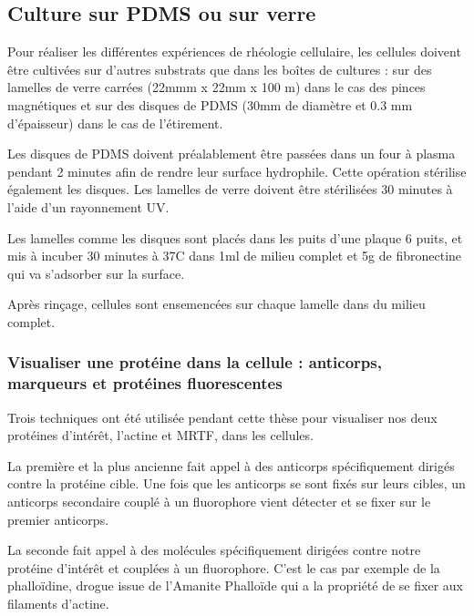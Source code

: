 	\subsection{Culture sur PDMS ou sur verre  \label{Coating}}

	Pour réaliser les différentes expériences de rhéologie cellulaire, les cellules doivent être cultivées sur d'autres substrats que dans les boîtes de cultures : sur des lamelles de verre carrées (22mmm x 22mm x 100 \micro m) dans le cas des pinces magnétiques et sur des disques de PDMS (30mm de diamètre et 0.3 mm d'épaisseur) dans le cas de l'étirement. 
	
	Les disques de PDMS doivent préalablement être passées dans un four à plasma pendant 2 minutes afin de rendre leur surface hydrophile. Cette opération stérilise également les disques. Les lamelles de verre doivent être stérilisées 30 minutes à l'aide d'un rayonnement UV. 
	
	Les lamelles comme les disques sont placés dans les puits d'une plaque 6 puits, et mis à incuber 30 minutes à 37\degres   C dans 1ml de milieu complet et 5\micro g de fibronectine qui va s'adsorber sur la surface. 
	
	Après rinçage,  cellules sont ensemencées sur chaque lamelle dans du milieu complet. 
	
	\subsubsection{Visualiser une protéine dans la cellule : anticorps, marqueurs et protéines fluorescentes}
	
	Trois techniques ont été utilisée pendant cette thèse pour visualiser nos deux protéines d'intérêt, l'actine et MRTF, dans les cellules. 
	
	La première et la plus ancienne fait appel à des anticorps spécifiquement dirigés contre la protéine cible. Une fois que les anticorps se sont fixés sur leurs cibles, un anticorps secondaire couplé à un fluorophore vient détecter et se fixer sur le premier anticorps. 
	
	La seconde fait appel à des molécules spécifiquement dirigées contre notre protéine d'intérêt et couplées à un fluorophore. C'est le cas par exemple de la phalloïdine, drogue issue de l'Amanite Phalloïde qui a la propriété de se fixer aux filaments d'actine.	
	
